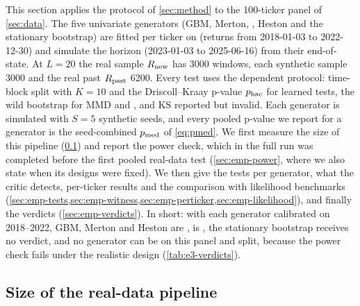This section applies the protocol of \cref{sec:method} to the 100-ticker panel of
\cref{sec:data}. The five univariate generators (GBM, Merton, \GARCHt{}, Heston and the
stationary bootstrap) are fitted per ticker on \TRAIN{} (returns from 2018-01-03 to 2022-12-30) and simulate
the \TEST{} horizon (2023-01-03 to 2025-06-16) from their end-of-\TRAIN{} state. At $L=20$ the
real \TEST{} sample $R_{\mathrm{new}}$ has 3000 windows, each synthetic sample 3000 and the real past
$R_{\mathrm{past}}$ 6200. Every test uses the dependent protocol: time-block split with $K=10$ and the
Driscoll--Kraay p-value $p_{\mathrm{hac}}$ for learned tests, the wild bootstrap for MMD and \SigMMD{}, and
KS reported but invalid. Each generator is simulated with $S=5$ synthetic seeds, and every
pooled p-value we report for a generator is the seed-combined $p_{\mathrm{med}}$ of \eqref{eq:pmed}. We first measure
the size of this pipeline (\cref{sec:emp-placebo}) and report the power check, which in the full
run was completed before the first pooled real-data test (\cref{sec:emp-power}, where we also
state when its designs were fixed). We then give the tests per generator,
what the critic detects, per-ticker results and the comparison with likelihood benchmarks
(\cref{sec:emp-tests,sec:emp-witness,sec:emp-perticker,sec:emp-likelihood}), and finally the
verdicts (\cref{sec:emp-verdicts}). In short: with each generator calibrated on 2018--2022, GBM,
Merton and Heston are \BAD{}, \GARCHt{} is \INCONCL{}, the stationary bootstrap receives no
verdict, and no generator can be \GOOD{} on this panel and split, because the power check fails
under the realistic design (\cref{tab:e3-verdicts}).

\subsection{Size of the real-data pipeline}\label{sec:emp-placebo}

